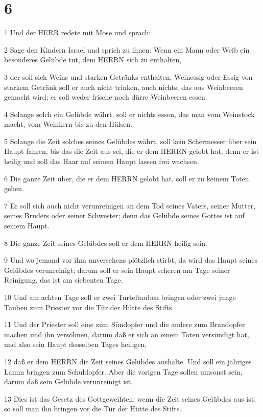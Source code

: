 \chapter{6}

\par 1 Und der HERR redete mit Mose und sprach:
\par 2 Sage den Kindern Israel und sprich zu ihnen: Wenn ein Mann oder Weib ein besonderes Gelübde tut, dem HERRN sich zu enthalten,
\par 3 der soll sich Weins und starken Getränks enthalten; Weinessig oder Essig von starkem Getränk soll er auch nicht trinken, auch nichts, das aus Weinbeeren gemacht wird; er soll weder frische noch dürre Weinbeeren essen.
\par 4 Solange solch ein Gelübde währt, soll er nichts essen, das man vom Weinstock macht, vom Weinkern bis zu den Hülsen.
\par 5 Solange die Zeit solches seines Gelübdes währt, soll kein Schermesser über sein Haupt fahren, bis das die Zeit aus sei, die er dem HERRN gelobt hat; denn er ist heilig und soll das Haar auf seinem Haupt lassen frei wachsen.
\par 6 Die ganze Zeit über, die er dem HERRN gelobt hat, soll er zu keinem Toten gehen.
\par 7 Er soll sich auch nicht verunreinigen an dem Tod seines Vaters, seiner Mutter, seines Bruders oder seiner Schwester; denn das Gelübde seines Gottes ist auf seinem Haupt.
\par 8 Die ganze Zeit seines Gelübdes soll er dem HERRN heilig sein.
\par 9 Und wo jemand vor ihm unversehens plötzlich stirbt, da wird das Haupt seines Gelübdes verunreinigt; darum soll er sein Haupt scheren am Tage seiner Reinigung, das ist am siebenten Tage.
\par 10 Und am achten Tage soll er zwei Turteltauben bringen oder zwei junge Tauben zum Priester vor die Tür der Hütte des Stifts.
\par 11 Und der Priester soll eine zum Sündopfer und die andere zum Brandopfer machen und ihn versöhnen, darum daß er sich an einem Toten versündigt hat, und also sein Haupt desselben Tages heiligen,
\par 12 daß er dem HERRN die Zeit seines Gelübdes aushalte. Und soll ein jähriges Lamm bringen zum Schuldopfer. Aber die vorigen Tage sollen umsonst sein, darum daß sein Gelübde verunreinigt ist.
\par 13 Dies ist das Gesetz des Gottgeweihten: wenn die Zeit seines Gelübdes aus ist, so soll man ihn bringen vor die Tür der Hütte des Stifts.
